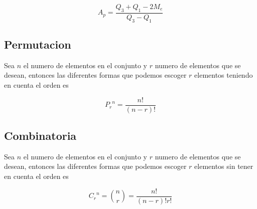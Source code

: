 \documentclass[10pt,a4paper]{article}
\begin{document}
$$ A_p = \dfrac{ Q_3 + Q_1 - 2M_e }{ Q_3 - Q_1 } $$

\subsection{Permutacion}

Sea $n$ el numero de elementos en el conjunto y $r$ numero de elementos que se desean, entonces las diferentes formas que podemos escoger $r$ elementos teniendo en cuenta el orden es

$$ {P_r}^n = \dfrac{n!}{ \left( n-r \right)! } $$

\subsection{Combinatoria}

Sea $n$ el numero de elementos en el conjunto y $r$ numero de elementos que se desean, entonces las diferentes formas que podemos escoger $r$ elementos sin tener en cuenta el orden es


$$ {C_r}^n = \binom{n}{r} = \dfrac{n!}{ \left( n-r \right)! r! } $$
\end{document}
